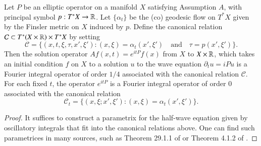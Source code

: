\begin{theorem} \label{waveisanFIOTheorem}
  Let $P$ be an elliptic operator on a manifold $X$ satisfying Assumption $A$, with principal symbol $p: T^* X \to \operatorname{\mathbb{R}}$. Let $\{ \alpha_t \}$ be the (co) geodesic flow on $T^* X$ given by the Finsler metric on $X$ induced by $p$.  Define the canonical relation $\mathcal{C} \subset T^* (X \times \operatorname{\mathbb{R}}) \times T^* X$ by setting
  \[ \mathcal{C} = \{ (x,t,\xi,\tau,x',\xi') : (x,\xi) = \alpha_t(x',\xi') \quad\text{and}\quad \tau = p(x',\xi') \}. \]
  Then the solution operator $Af(x,t) = e^{i t P}f(x)$ from $X$ to $X \times \operatorname{\mathbb{R}}$, which takes an initial condition $f$ on $X$ to a solution $u$ to the wave equation $\partial_t u = i P u$ is a Fourier integral operator of order $1/4$ associated with the canonical relation $\mathcal{C}$. For each fixed $t$, the operator $e^{i t P}$ is a Fourier integral operator of order $0$ associated with the canonical relation
  \[ \mathcal{C}_t = \{ (x,\xi;x',\xi') : (x,\xi) = \alpha_t(x',\xi') \}. \]
\end{theorem}
\begin{proof}
  It suffices to construct a parametrix for the half-wave equation given by oscillatory integrals that fit into the canonical relations above. One can find such parametrices in many sources, such as Theorem 29.1.1 of \cite{Hormander4} or Theorem 4.1.2 of \cite{Sogge}.
\end{proof}


